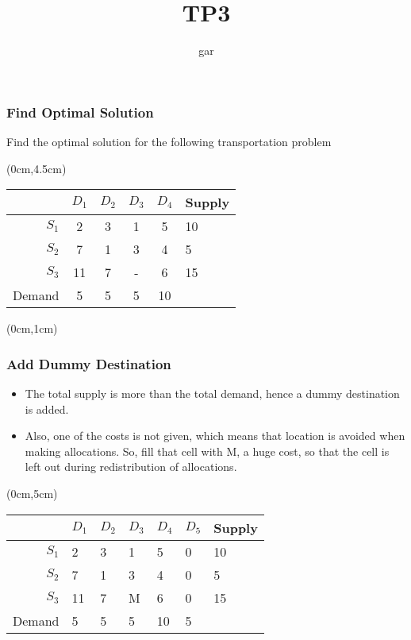 \documentclass[11pt]{beamer}
\title{TP3}
\author{gar}
\date{}
\begin{document}
\maketitle

\begin{frame}[fragile]\frametitle{Find Optimal Solution}

Find the optimal solution for the following transportation problem

\begin{textblock*}{9cm}(0cm,4.5cm)
\begin{center}
\begin{tabular}{|r|cccc|l|}
\hline
        & $D_1$ & $D_2$ & $D_3$ & $D_4$ & Supply \\
\hline
  $S_1$ & 2     & 3     & 1     & 5     & 10     \\
 $S_2$  & 7     & 1     & 3     & 4     & 5      \\
 $S_3$  & 11    & 7     & -     & 6     & 15     \\
\hline
 Demand & 5     & 5     & 5     & 10    &        \\
\hline
\end{tabular}
\end{center}
\end{textblock*}
\end{frame}

\begin{frame}
\begin{textblock*}{12cm}(0cm,1cm)
  \frametitle{Add Dummy Destination}
  \begin{itemize}
  \item The total supply is more than the total demand, hence a dummy destination is added.
  \item Also, one of the costs is not given, which means that location is avoided when making allocations. So, fill that cell 
with M, a huge cost, so that the cell is left out during redistribution of allocations.
\end{itemize}
\end{textblock*}
\begin{textblock*}{12cm}(0cm,5cm)
\begin{center}
\begin{tabular}{|r|p{1cm}p{1cm}p{1cm}p{1cm}p{1cm}|l|}
\hline
        & $D_1$ & $D_2$ & $D_3$ & $D_4$ & $D_5$ & Supply \\
\hline                                 
  $S_1$ & 2     & 3     & 1     & 5     & 0     & 10     \\
 $S_2$  & 7     & 1     & 3     & 4     & 0     & 5      \\
 $S_3$  & 11    & 7     & M     & 6     & 0     & 15     \\
\hline                                 
 Demand & 5     & 5     & 5     & 10    & 5     &        \\
\hline
\end{tabular}
\end{center}
\end{textblock*}
\end{frame}
\end{document}

